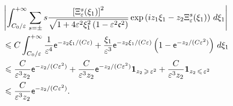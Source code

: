 \documentclass[AHL,Unicode,longabstracts,published]{cedram}
\newcommand{\bfun}{\mathbf{1}}
\newcommand*\ex{{\sf e}}
\newcommand*\cs{{\mathfrak c}}
\newcommand*\ii{\infty}
\newcommand*\gs{\geqslant }
\newcommand*\ls{\leqslant }
\newcommand*\e{\varepsilon}
\begin{document}
\begin{multline*}
\left\lvert \int_{C_0/ \e}^{+\ii}
\sum_{ s = \pm} s \frac{\left[\Xi_\e^s (\xi_1)\right]^2 }{\sqrt{1 + 4 \e^2 \xi_1^2 \left(1 - \e^2 \cs^2\right)}}
\exp\left(iz_1 \xi_1 - z_2 \Xi_\e^s (\xi_1)\right) \, d \xi_1 \right\rvert\\
\begin{aligned} 
& \ls C \int_{C_0/ \e}^{+\ii} \frac{1}{\e^4} \ex^{ - z_2 \xi_1/ (C\e) } + \frac{\xi_1}{\e^3} \ex^{ - z_2 \xi_1/ (C\e) } \left(1 - \ex^{ - z_2 / (C\e^2)}\right) \, d \xi_1
\\ & \ls
\frac{C}{ \e^3 z_2 } \ex^{ - z_2 / (C\e^2) } + \frac{C}{ \e^3 z_2 } \ex^{ - z_2 / (C\e^2) } \bfun_{z_2\, \gs\,\e^2 } + \frac{C}{ \e^3 z_2 } \bfun_{z_2\,\ls\,\e^2 }
\\ & \ls
\frac{C}{ \e^3 z_2 } \ex^{ - z_2 / (C\e^2) }.
\end{aligned}
\end{multline*}
\end{document}
